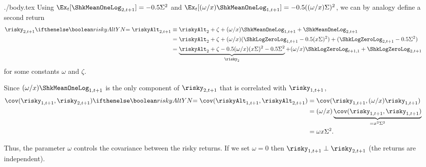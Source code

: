 \documentclass{handout}
\begin{document}
\begin{verbatimwrite}{./body.tex}
Using $\Ex_{t}[\ShkMeanOneLog_{2,t+1}] = -0.5 \sigAll^{2}$ and $\Ex_{t}[(\omega/\scale)\ShkMeanOneLog_{1,t+1}] = -0.5 ((\omega/\scale)\sigAll)^{2}$, we can by analogy define a second return
\begin{equation}\begin{gathered}\begin{aligned}
   \risky_{2,t+1} \ifriskyAlt{= \riskyAlt_{2,t+1}}{} & \equiv  \riskyAlt_{2}+\zeta + (\omega /\scale) \ShkMeanOneLog_{1,t+1} + \ShkMeanOneLog_{2,t+1} \label{eq:r2tp1CheckDef}
\\ & =  \riskyAlt_{2}+\zeta + (\omega /\scale) (\ShkLogZeroLog_{1,t+1}-0.5(\scale \sigAll)^{2}) + (\ShkLogZeroLog_{2,t+1}-0.5 \sigAll^{2})
\\ & =  \underbrace{\riskyAlt_{2}+\zeta -0.5 (\omega/\scale)(\scale \sigAll)^2-0.5 \sigAll^{2}}_{\risky_{2}}+(\omega /\scale) \ShkLogZeroLog_{t+1,1}  + \ShkLogZeroLog_{2,t+1} %
\end{aligned}\end{gathered}\end{equation}
for some constants $\omega$ and $\zeta$.  

Since $(\omega/\scale)\ShkMeanOneLog_{1,t+1} $ is the only component of ${\risky}_{2,t+1}$ that is correlated with ${\risky}_{1,t+1}$,
\begin{equation*}\begin{gathered}\begin{aligned}
  \cov({\risky}_{1,t+1} ,{\risky}_{2,t+1})\ifriskyAlt{=  \cov(\riskyAlt_{1,t+1} ,\riskyAlt_{2,t+1})}{} & =  \cov({\risky}_{1,t+1} , (\omega/\scale){\risky}_{1,t+1} )
\\ & =  (\omega /\scale ) \underbrace{\cov({\risky}_{1,t+1} ,{\risky}_{1,t+1} )}_{=\scale^{2}\sigAll^{2}}
\\ & =  \omega \scale \sigAll^{2} \label{eq:Cov}
.
\end{aligned}\end{gathered}\end{equation*}

Thus, the parameter $\omega$ controls the covariance between the risky returns.  If we set $\omega = 0$ then $\risky_{1,t+1} \perp \risky_{2,t+1}$ (the returns are independent).


\end{verbatimwrite}
\end{document}
